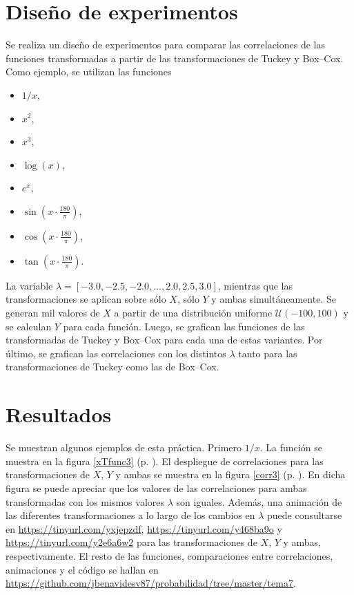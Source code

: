 \documentclass[paper=leter, fontsize=11pt]{scrartcl}
\numberwithin{equation}{section}		%
\numberwithin{figure}{section}			%
\numberwithin{table}{section}				%
\begin{document}
\section{Diseño de experimentos}
Se realiza un diseño de experimentos para comparar las correlaciones de las funciones transformadas a partir de las transformaciones de Tuckey y Box--Cox. Como ejemplo, se utilizan las funciones
\begin{itemize}
    \item $1 / x$,
    \item $x ^ 2$,
    \item $x ^ 3$,
    \item $\log (x)$,
    \item $e ^ x$,
    \item $\sin(x \cdot \frac{180}{\pi})$,
    \item $\cos(x \cdot \frac{180}{\pi})$,
    \item $\tan(x \cdot \frac{180}{\pi})$.
\end{itemize}

La variable  $\lambda = [-3.0, -2.5, -2.0, \ldots, 2.0, 2.5, 3.0 ]$, mientras que las transformaciones se aplican sobre sólo $X$, sólo $Y$ y ambas simultáneamente. Se generan mil valores de $X$ a partir de una distribución uniforme $\mathcal{U}(-100, 100)$ y se calculan $Y$ para cada función. Luego, se grafican las funciones de las transformadas de Tuckey y Box--Cox para cada una de estas variantes. Por último, se grafican las correlaciones con los distintos $\lambda$ tanto para las transformaciones de Tuckey como las de Box--Cox.

\section{Resultados}
Se muestran algunos ejemplos de esta práctica. Primero $1/x$. La función se muestra en la figura \ref{xTfunc3} (p. \pageref{xTfunc3}). El despliegue de correlaciones para las transformaciones de $X$, $Y$ y ambas se muestra en la figura \ref{corr3} (p. \pageref{corr3}). En dicha figura se puede apreciar que los valores de las correlaciones para ambas transformadas con los mismos valores $\lambda$ son iguales. Además, una animación de las diferentes transformaciones a lo largo de los cambios en $\lambda$ puede consultarse en \url{https://tinyurl.com/yxjepzdf}, \url{https://tinyurl.com/y468ba9o} y \url{https://tinyurl.com/y2e6a6w2} para las transformaciones de $X$, $Y$ y ambas, respectivamente. El resto de las funciones, comparaciones entre correlaciones, animaciones y el código se hallan en \url{https://github.com/jbenavidesv87/probabilidad/tree/master/tema7}.
\end{document}
